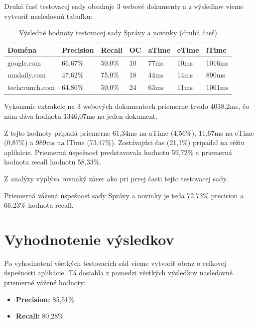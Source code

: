 \newpage

Druhá časť testovacej sady obsahuje 3 webové dokumenty a z výsledkov vieme vytvoriť nasledovnú tabuľku:

\begin{table}[hbt]
\caption{Výsledné hodnoty testovacej sady Správy a novinky (druhá časť)}
\centering
\begin{tabular}{|l|l|l|l|l|l|l|}
\hline
\textbf{Doména}          & \textbf{Precision} & \textbf{Recall}  & \textbf{OC}  & \textbf{aTime} & \textbf{eTime} & \textbf{lTime}  \\ \hline
google.com              & 66,67\%   & 50,0\%  & 10 & 77ms  & 10ms  & 1016ms \\ \hline
mndaily.com             & 47,62\%   & 75,0\%  & 18 & 44ms  & 14ms  & 890ms  \\ \hline
techcrunch.com          & 64,86\%   & 50,0\%  & 24 & 63ms  & 11ms  & 1061ms \\ \hline
\end{tabular}
\end{table}

Vykonanie extrakcie na 3 webových dokumentoch priemerne trvalo 	4038,2ms, čo nám dáva hodnotu 1346,07ms na jeden dokument. 

Z tejto hodnoty pripadá priemerne 61,34ms na aTime (4,56\%), 11,67ms na eTime (0,87\%) a 989ms na lTime (73,47\%). Zostávajúci čas (21,1\%) pripadal na réžiu aplikácie. Priemerná úspešnosť predstavovala hodnotu 59,72\% a priemerná hodnota recall hodnotu 58,33\%. 

\bigskip

Z analýzy vyplýva rovnaký záver ako pri prvej časti tejto testovacej sady. 

\bigskip

Priemerná vážená úspešnosť sady Správy a novinky je teda 72,73\% precision a 66,23\% hodnota recall.

\section{Vyhodnotenie výsledkov}

Po vyhodnotení všetkých testovacích sád vieme vytvoriť obraz o celkovej úspešnosti aplikácie. Tá dosiahla z pomedzi všetkých výsledkov nasledovné priemerné vážené hodnoty:

\begin{itemize}
    \item \textbf{Precision:} 85,51\%
    \item \textbf{Recall:} 80,28\%
\end{itemize}

